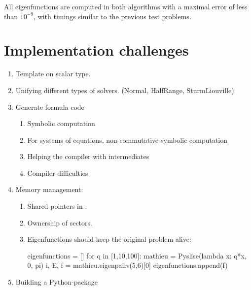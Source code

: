 All eigenfunctions are computed in both algorithms with a maximal error of less than $10^{-9}$, with timings similar to the previous test problems.

\section{Implementation challenges}


\begin{enumerate}
    \item Template on scalar type.
    \item Unifying different types of solvers. (Normal, HalfRange, SturmLiouville)
    \item Generate formula code
          \begin{enumerate}
              \item Symbolic computation
              \item For systems of equations, non-commutative symbolic computation
              \item Helping the compiler with intermediates
              \item Compiler difficulties
          \end{enumerate}
    \item Memory management:
          \begin{enumerate}
              \item Shared pointers in \cpp{}.
              \item Ownership of sectors.
              \item Eigenfunctions should keep the original problem alive:
\begin{python}
eigenfunctions = []
for q in [1,10,100]:
    mathieu = Pyslise(lambda x: q*x, 0, pi)
    i, E, f = mathieu.eigenpairs(5,6)[0]
    eigenfunctions.append(f)
\end{python}
          \end{enumerate}
    \item Building a Python-package
\end{enumerate}

\stopchapter
